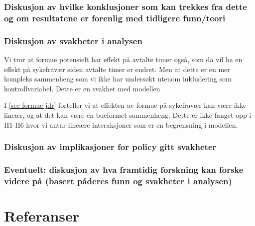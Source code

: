 \documentclass[
  12pt,
  a4paper,
  DIV=11,
  numbers=noendperiod]{scrartcl}
\begin{document}
\subsubsection{Diskusjon av hvilke konklusjoner som kan trekkes fra
dette og om resultatene er forenlig med tidligere
funn/teori}\label{diskusjon-av-hvilke-konklusjoner-som-kan-trekkes-fra-dette-og-om-resultatene-er-forenlig-med-tidligere-funnteori}

\subsubsection{Diskusjon av svakheter i
analysen}\label{diskusjon-av-svakheter-i-analysen}

Vi tror at formue potensielt har effekt på avtalte timer også, som da
vil ha en effekt på sykefravær siden avtalte timer er endret. Men at
dette er en mer kompleks sammenheng som vi ikke har undersøkt utenom
inkludering som kontrollvariabel. Dette er en svakhet med modellen

I \autoref{sec-formue-jdr} forteller vi at effekten av formue på
sykefravær kan være ikke-lineær, og at det kan være en bueformet
sammenheng. Dette er ikke fanget opp i H1-H6 hvor vi antar lineære
interaksjoner som er en begrensning i modellen.

\subsubsection{Diskusjon av implikasjoner for policy gitt
svakheter}\label{diskusjon-av-implikasjoner-for-policy-gitt-svakheter}

\subsubsection{Eventuelt: diskusjon av hva framtidig forskning kan
forske videre på (basert påderes funn og svakheter i
analysen)}\label{eventuelt-diskusjon-av-hva-framtidig-forskning-kan-forske-videre-puxe5-basert-puxe5deres-funn-og-svakheter-i-analysen}

\newpage

\section*{Referanser}\label{referanser}
\end{document}
